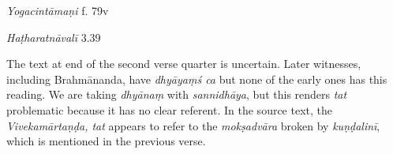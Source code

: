 \begin{ekdosis}
\begin{sources}[hp01_048]
\end{sources}

\begin{testimonia}[hp01_048]
\emph{Yogacintāmaṇi} f. 79v

\begin{versinnote}
\end{versinnote}

\emph{Haṭharatnāvalī} 3.39

\begin{versinnote}
\tl{\var{proccārayet ] proccālayat P,T,t1,n2}\\!}
\end{versinnote}

\end{testimonia}

\begin{philcomm}[hp01_048]

The text at end of the second verse quarter is uncertain. Later witnesses, including Brahmānanda, have \emph{dhyāyaṃś ca} but none of the early ones has this reading. We are taking \emph{dhyānaṃ} with \emph{sannidhāya}, but this renders \emph{tat} problematic because it has no clear referent. In the source text, the \emph{Vivekamārtaṇḍa, tat} appears to refer to the \emph{mokṣadvāra} broken by \emph{kuṇḍalinī}, which is mentioned in the previous verse. 


\end{philcomm}
\end{ekdosis}
